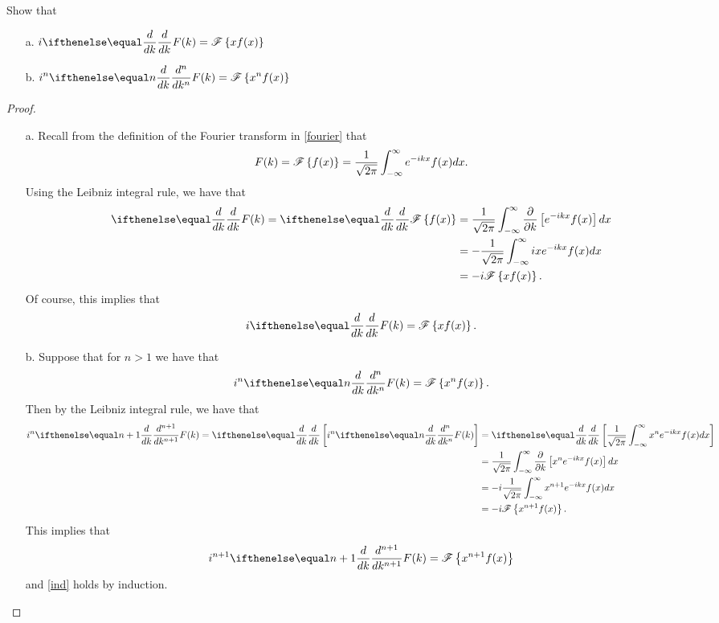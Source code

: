 \begin{problem}{2.3}
  Show that
  \begin{enumerate}
    \item [a.] $\displaystyle i \der{k}{} F(k) = \fourier{x f(x)}$
    \item [b.] $\displaystyle i^n \der{k}{n} F(k) = \fourier{x^n f(x)}$
  \end{enumerate}
\end{problem}

\begin{proof}
  \begin{enumerate}
    \item [a.] Recall from the definition of the Fourier transform in \eqref{fourier} that
      \begin{align*}
        F(k) = \mathscr{F}\left\{ {f(x)} \right\} = \frac{1}{\sqrt{2\pi}}\int_{-\infty}^{\infty} e^{-ikx} f(x) dx.
      \end{align*}
      Using the Leibniz integral rule, we have that
      \begin{align*}
        \der{k}{}F(k) = \der{k}{}\fourier{f(x)} &= \frac{1}{\sqrt{2\pi}}\int_{-\infty}^{\infty} \frac{\partial }{\partial k}\left[e^{-ikx} f(x)\right] dx\\
        &= -\frac{1}{\sqrt{2\pi}}\int_{-\infty}^{\infty} ix e^{-ikx} f(x)dx \\
        &= - i \fourier{x f(x)}.
      \end{align*}
      Of course, this implies that
      \begin{align*}
        i \der{k}{}F(k) = \fourier{x f(x)}.
      \end{align*}
    \item [b.] Suppose that for $n  > 1$ we have that
      \begin{align}\label{ind}
        i^n \der{k}{n} F(k) = \fourier{x^n f(x)}.
      \end{align}
      Then by the Leibniz integral rule, we have that
      \begin{align*}
        i^n \der{k}{n+1} F(k) = \der{k}{}\left[i^n \der{k}{n} F(k)\right]
        &= \der{k}{}\left[\frac{1}{\sqrt{2\pi}} \int_{-\infty}^{\infty} x^n e^{-ikx} f(x) dx \right]\\
        &= \frac{1}{\sqrt{2\pi}}\int_{-\infty}^{\infty} \frac{\partial }{\partial k}\left[x^ne^{-ikx} f(x)\right] dx\\
        &= -i\frac{1}{\sqrt{2\pi}}\int_{-\infty}^{\infty} x^{n+1} e^{-ikx} f(x)dx \\
        &= -i \fourier{x^{n+1}f(x)}.
      \end{align*}
      This implies that
      \begin{align*}
        i^{n+1} \der{k}{n+1} F(k) = \fourier{x^{n+1} f(x)}
      \end{align*}
      and \eqref{ind} holds by induction.
  \end{enumerate}
\end{proof}
\newpage
